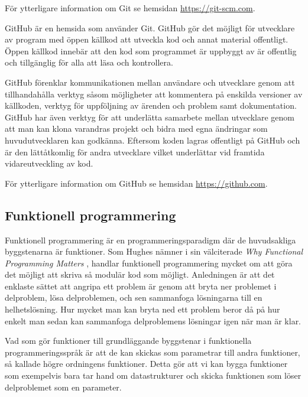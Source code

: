 \documentclass[12pt,a4paper,twoside,openright]{article}
\begin{document}
För ytterligare information om Git se hemsidan
\url{https://git-scm.com}.

\gls{GitHub} är en hemsida som använder Git. GitHub gör det möjligt för
utvecklare av program med öppen källkod att utveckla kod och annat
material offentligt. Öppen källkod innebär att den kod som programmet
är uppbyggt av är offentlig och tillgänglig för alla att läsa och
kontrollera.

GitHub förenklar kommunikationen mellan användare och utvecklare genom
att tillhandahålla verktyg såsom möjligheter att kommentera
på enskilda versioner av källkoden, verktyg för uppföljning av ärenden
och problem samt dokumentation. GitHub har även verktyg för att
underlätta samarbete mellan utvecklare genom att man kan klona
varandras projekt och bidra med egna ändringar som huvudutvecklaren
kan godkänna. Eftersom koden lagras offentligt på GitHub och är den
lättåtkomlig för andra utvecklare vilket underlättar vid framtida
vidareutveckling av kod.

För ytterligare information om GitHub se hemsidan
\url{https://github.com}.

\subsection{Funktionell programmering}
Funktionell programmering är en programmeringsparadigm där de
huvudsakliga byggstenarna är funktioner. Som Hughes nämner i sin
välciterade \textit{Why Functional Programming Matters}
\cite{hughes1989functional}, handlar funktionell programmering mycket
om att göra det möjligt att skriva så modulär kod som möjligt.
Anledningen är att det enklaste sättet att angripa ett problem är
genom att bryta ner problemet i delproblem, lösa delproblemen, och sen
sammanfoga lösningarna till en helhetslösning.  Hur mycket man kan
bryta ned ett problem beror då på hur enkelt man sedan kan sammanfoga
delproblemens lösningar igen när man är klar.

Vad som gör funktioner till grundläggande byggstenar i funktionella
programmeringsspråk är att de kan skickas som parametrar till andra
funktioner, så kallade högre ordningens funktioner. Detta gör att vi
kan bygga funktioner som exempelvis bara tar hand om datastrukturer
och skicka funktionen som löser delproblemet som en parameter.
\end{document}
